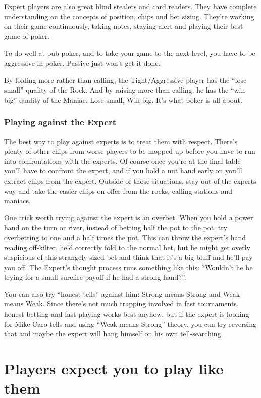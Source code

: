 Expert players are also great blind stealers and card readers.
They have complete understanding on
the concepts of position, chips and bet sizing. They're working on
their game continuously, taking notes, staying alert and playing
their best game of poker.

To do well at pub poker, and to take your game to the next level,
you have to be aggressive in poker. Passive just won't get it done.

By folding more rather than calling, the Tight/Aggressive player
has the ``lose small'' quality of the Rock. And by raising more than
calling, he has the ``win big'' quality of the Maniac. Lose small, Win big.
It's what poker is all about.

\subsubsection{Playing against the Expert}

The best way to play against experts
is to treat them with respect. There's plenty of other chips
from worse players to be mopped up before you have to run into
confrontations with the experts. Of course once you're at the final
table you'll have to confront the expert, and if you hold a nut hand
early on you'll extract chips from the expert. Outside of those
situations, stay out of the experts way and take the easier chips
on offer from the rocks, calling stations and maniacs.

One trick worth trying against the expert is an overbet. When you
hold a power hand on the turn or river, instead of betting half the pot
to the pot, try overbetting to one and a half times the pot. This can
throw the expert's hand reading off-kilter, he'd correctly fold to
the normal bet, but he might get overly suspicious of this strangely
sized bet and think that it's a big bluff and he'll pay you off.
The Expert's thought process runs something like this: ``Wouldn't he
be trying for a small surefire payoff if he had a strong hand?''.

You can also try ``honest tells'' against him: Strong means Strong and
Weak means Weak. Since there's not much trapping involved in fast
tournaments, honest betting and fast playing works best anyhow, but
if the expert is looking for Mike Caro tells and using
``Weak means Strong'' theory, you can try reversing that and maybe
the expert will hang himself on his own tell-searching.

\section{Players expect you to play like them}

